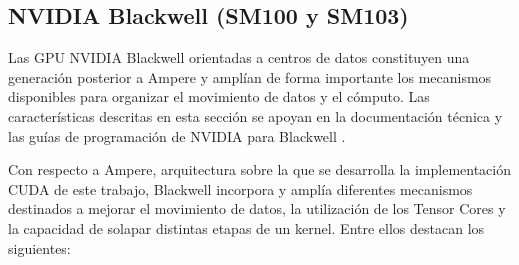 \subsection{NVIDIA Blackwell (SM100 y SM103)}

Las GPU NVIDIA Blackwell orientadas a centros de datos constituyen una generación posterior a Ampere y amplían de forma importante los mecanismos disponibles para organizar el movimiento de datos y el cómputo. Las características descritas en esta sección se apoyan en la documentación técnica y las guías de programación de NVIDIA para Blackwell \cite{nvidiaBlackwell,nvidiaPTX}.

Con respecto a Ampere, arquitectura sobre la que se desarrolla la implementación CUDA de este trabajo, Blackwell incorpora y amplía diferentes mecanismos destinados a mejorar el movimiento de datos, la utilización de los Tensor Cores y la capacidad de solapar distintas etapas de un kernel. Entre ellos destacan los siguientes:

